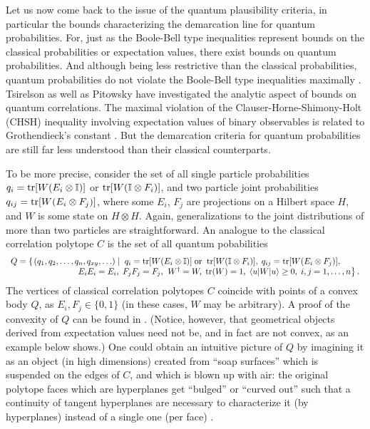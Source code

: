 Let us now come back to the issue of the
quantum plausibility criteria, in particular the bounds
characterizing the demarcation line for quantum probabilities.
For, just as the Boole-Bell type inequalities represent bounds on the
classical probabilities or expectation values,
there exist bounds on quantum probabilities.
And although being less restrictive than the classical probabilities,
quantum probabilities do not violate the
Boole-Bell type inequalities maximally \cite{pop-rohr,svozil-krenn}.
Tsirelson \cite{cirelson:80,cirelson,khalfin-97}
as well as Pitowsky \cite{pit:range-2001}
have investigated the analytic aspect of bounds on quantum correlations.
The maximal violation of the
Clauser-Horne-Shimony-Holt (CHSH) inequality involving expectation values of
binary observables is related to Grothendieck's constant
\cite{fishburn-reeds-1994}.
But the demarcation criteria for quantum probabilities
are still far less understood than their classical counterparts.

To be more precise,
consider the set of all  single particle
probabilities
$q_{i}={\rm tr}[W(E_{i}\otimes {\Bbb I})]$
or
${\rm tr}[W({\Bbb I}\otimes F_{i})]$,
and two particle joint probabilities
$q_{ij}={\rm tr}[W(E_{i}\otimes F_{j})]$, where some $E_{i}$,
$F_{j}$ are projections on a Hilbert space $H$,
and $W$ is some state on $H\otimes H$.
Again, generalizations to the joint distributions of more than two particles are straightforward.
An analogue to the classical correlation polytope  $C$
is the set of all quantum pobabilities
\begin{equation}
\begin{array}{l}
Q
= \left\{
\left.
\large(q_1, q_2,\ldots , q_n, q_{xy},\ldots \large)
\; \right| \right.\;
q_{i}={\rm tr}[W(E_{i}\otimes {\Bbb I})]\;{\rm or}\;\;{\rm tr}[W({\Bbb I}\otimes F_{i})],\; q_{ij}={\rm tr}[W(E_{i}\otimes F_{j})],\;  \\
\qquad\qquad
\qquad\qquad
E_{i}E_{i}=E_{i},\; F_{j}F_{j}=F_{j},\;
\left.
W^\dagger =W,\; {\rm tr} (W)=1,\;
\langle u | W | u \rangle \ge 0,\;
i,j=1,\ldots ,n
\right\}.
\end{array}\nonumber
\end{equation}
The vertices of classical correlation polytopes $C$
coincide with points of a convex body $Q$, as $E_i,F_j\in \{0,1\}$
(in these cases, $W$ may be arbitrary).
A proof of the convexity of $Q$ can be found in  \cite{pit:range-2001}.
(Notice, however, that geometrical objects derived from expectation values
need not be, and in fact are not convex, as an example below shows.)
One could obtain an intuitive picture of $Q$ by imagining
it as an object (in high dimensions) created from ``soap surfaces''
which is suspended on the edges of
$C$, and which is blown up with air: the original polytope
faces which are hyperplanes get ``bulged''
or ``curved out'' such that a continuity of tangent hyperplanes are
necessary to characterize it (by hyperplanes) instead of a single one
(per face) \cite{khalfin-97}.


